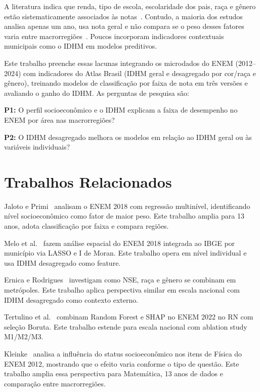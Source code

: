 \documentclass[12pt]{article}
\begin{document}
A literatura indica que renda, tipo de escola, escolaridade dos pais,
raça e gênero estão sistematicamente associados às
notas~\cite{jaloto2021fatores,melo2021impacto}. Contudo, a maioria dos
estudos analisa apenas um ano, usa nota geral e não compara se o peso
desses fatores varia entre macrorregiões~\cite{dutra2023fatores}. Poucos
incorporam indicadores contextuais municipais como o IDHM em modelos
preditivos.

Este trabalho preenche essas lacunas integrando os microdados do ENEM
(2012--2024) com indicadores do Atlas Brasil (IDHM geral e desagregado
por cor/raça e gênero), treinando modelos de classificação por faixa de
nota em três versões e avaliando o ganho do IDHM. As perguntas de
pesquisa são:

\textbf{P1:} O perfil socioeconômico e o IDHM explicam a faixa de
desempenho no ENEM por área nas macrorregiões?

\textbf{P2:} O IDHM desagregado melhora os modelos em relação ao IDHM
geral ou às variáveis individuais?

\section{Trabalhos Relacionados}

Jaloto e Primi~\cite{jaloto2021fatores} analisam o ENEM 2018 com
regressão multinível, identificando nível socioeconômico como fator de
maior peso. Este trabalho amplia para 13 anos, adota classificação por
faixa e compara regiões.

Melo et al.~\cite{melo2021impacto} fazem análise espacial do ENEM 2018
integrada ao IBGE por município via LASSO e I de Moran. Este trabalho
opera em nível individual e usa IDHM desagregado como feature.

Ernica e Rodrigues~\cite{ernica2020desigualdades} investigam como NSE,
raça e gênero se combinam em metrópoles. Este trabalho aplica perspectiva
similar em escala nacional com IDHM desagregado como contexto externo.

Tertulino et al.~\cite{tertulino2026fatores} combinam Random Forest e
SHAP no ENEM 2022 no RN com seleção Boruta. Este trabalho estende para
escala nacional com ablation study M1/M2/M3.

Kleinke~\cite{kleinke2017influencia} analisa a influência do status
socioeconômico nos itens de Física do ENEM 2012, mostrando que o efeito
varia conforme o tipo de questão. Este trabalho amplia essa perspectiva
para Matemática, 13 anos de dados e comparação entre macrorregiões.
\end{document}

